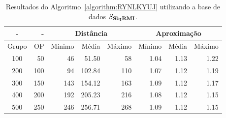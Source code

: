 \begin{table}[!htb]
  \caption{Resultados do Algoritmo~\ref{algorithm:RYNLKYUJ} utilizando a base de dados $S_{\textbf{Sb\textsubscript{I}RMI}}{}$.}
  \label{table:CIYAALPZ}
  \centering
  \begin{tabular}{|c|r|r|r|r|r|r|r|}
    \hline
      -      &  -   & \multicolumn{3}{c|}{Distância}             & \multicolumn{3}{c|}{Aproximação}           \\ \hline
    Grupo    & OP   & Mínimo       & Média        & Máximo       & Mínimo       & Média        & Máximo       \\ \hline  
    100      & 50   & 46           & 51.50        & 58           & 1.04         & 1.13         & 1.22         \\ \hline
    200      & 100  & 94           & 102.84       & 110          & 1.07         & 1.12         & 1.19         \\ \hline
    300      & 150  & 143          & 154.12       & 163          & 1.09         & 1.12         & 1.17         \\ \hline
    400      & 200  & 192          & 205.23       & 216          & 1.08         & 1.12         & 1.15         \\ \hline
    500      & 250  & 246          & 256.71       & 268          & 1.09         & 1.12         & 1.15         \\ \hline    
  \end{tabular}
\end{table}